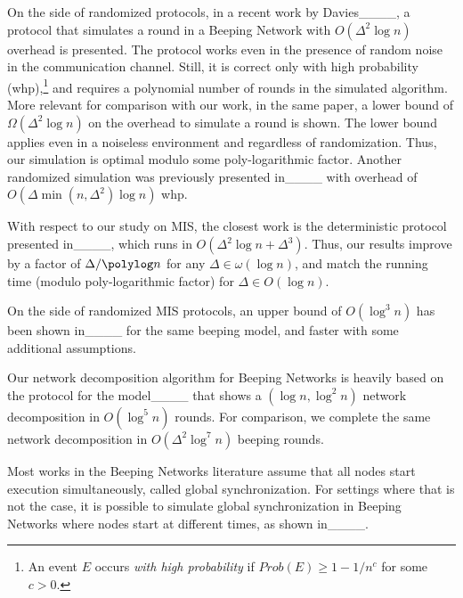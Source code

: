 On the side of randomized protocols, in a recent work by Davies____, a protocol that simulates a \congest round in a Beeping Network with $O(\Delta^2\log n)$ overhead is presented. The protocol works even in the presence of random noise in the communication channel. Still, it is correct only with high probability (whp),\footnote{An event $E$ occurs \emph{with high probability} if $Prob(E)\geq 1-1/n^c$ for some $c>0$.} and requires a polynomial number of \congest rounds in the simulated algorithm.   
More relevant for comparison with our work, in the same paper, a lower bound of $\Omega(\Delta^2 \log n)$ on the overhead to simulate a \congest round is shown. The lower bound applies even in a noiseless environment and regardless of randomization. 
Thus, our simulation is optimal modulo some poly-logarithmic factor. 
%
Another randomized simulation was previously presented in____ with overhead of $O(\Delta\min(n,\Delta^2)\log n)$ whp.



With respect to our study on MIS, the closest work is the deterministic protocol presented in____, which runs in $O(\Delta^2 \log n + \Delta^3)$. Thus, our results improve by a factor of $\Delta/\polylog n$ for any $\Delta\in \omega(\log n)$, and match the running time (modulo poly-logarithmic factor) for $\Delta\in O(\log n)$. 

On the side of randomized MIS protocols, an upper bound of $O(\log^3 n)$ has been shown in____ for the same beeping model, and faster with some additional assumptions.

Our network decomposition algorithm for Beeping Networks is heavily based on the protocol for the \congest model____ that shows a $(\log n, \log^2 n)$ network decomposition in $O(\log^5 n)$ \congest rounds. For comparison, we complete the same network decomposition in $O(\Delta^2 \log^7 n)$ beeping rounds.

Most works in the Beeping Networks literature assume that all nodes start execution simultaneously, called global synchronization. For settings where that is not the case, it is possible to simulate global synchronization in Beeping Networks where nodes start at different times, as shown in____.